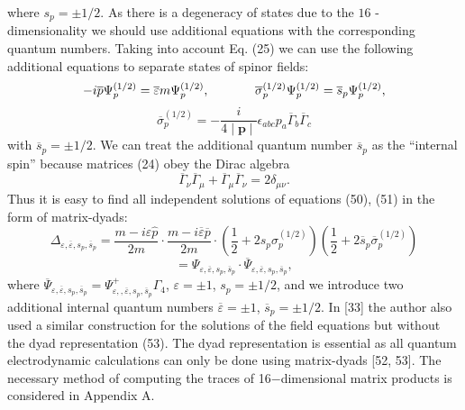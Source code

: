 \documentclass[a4paper,12pt]{article}
\begin{document}
where $s_p=\pm 1/2$. As there is a degeneracy of states due to the $16$ -
dimensionality we should use additional equations with the corresponding
quantum numbers. Taking into account Eq. (25) we can use the following
additional equations to separate states of spinor fields:
\[
-i\overline{p}\Psi _p^{(1/2)}=\overline{\varepsilon }m\Psi
_p^{(1/2)} ,\hspace{0.5in}\overline{\sigma }_p^{(1/2)}\Psi
_p^{(1/2)}=\overline{s}_p\Psi _p^{(1/2)} ,
\]
\vspace{-8mm}
\begin{equation}  \label{51}
\end{equation}
\vspace{-8mm}
\[
\overline{\sigma }_p^{(1/2)}=-\frac i{4\mid \mathbf{p}\mid }\epsilon
_{abc}p_a\overline{\Gamma }_b\overline{\Gamma }_c
\]
with $\overline{s}_p=\pm 1/2$. We can treat the additional quantum
number $ \overline{s}_p$ as the ``internal spin'' because matrices
(24) obey the Dirac algebra
\begin{equation}
\overline{\Gamma }_\nu \overline{\Gamma }_\mu +\overline{\Gamma
}_\mu \overline{\Gamma }_\nu =2\delta _{\mu \nu } . \label{52}
\end{equation}
Thus it is easy to find all independent solutions of equations (50), (51) in
the form of matrix-dyads:
\[
\Delta _{\varepsilon ,\overline{\varepsilon
},s_p,\overline{s}_p}=\frac{ m-i\varepsilon \widehat{p}}{2m}\cdot
\frac{m-i\overline{\varepsilon } \overline{p}}{2m}\cdot \left(
\frac 12+2s_p\sigma _p^{(1/2)}\right) \left( \frac
12+2\overline{s}_p\overline{\sigma }_p^{(1/2)}\right)
\]
\vspace{-8mm}
\begin{equation}  \label{53}
\end{equation}
\vspace{-8mm}
\[
=\Psi _{\varepsilon ,\overline{\varepsilon
},s_p,\overline{s}_p}\cdot \overline{\Psi }_{\varepsilon
,\overline{\varepsilon },s_p,\overline{s}_p} ,
\]
where $\overline{\Psi }_{\varepsilon ,\overline{\varepsilon
},s_p,\overline{s }_p}=\Psi _{\varepsilon ,,\overline{\varepsilon
},s_p,\overline{s} _p}^{+}\Gamma _4$, $\varepsilon =\pm 1$,
$s_p=\pm 1/2$, and we introduce two additional internal quantum
numbers $\overline{\varepsilon }=\pm 1$, $ \overline{s}_p=\pm
1/2$. In [33] the author also used a similar construction for the
solutions of the field equations but without the dyad
representation (53). The dyad representation is essential as all
quantum electrodynamic calculations can only be done using
matrix-dyads [52, 53]. The necessary method of computing the
traces of 16$-$dimensional matrix products is considered in
Appendix A.
\end{document}
